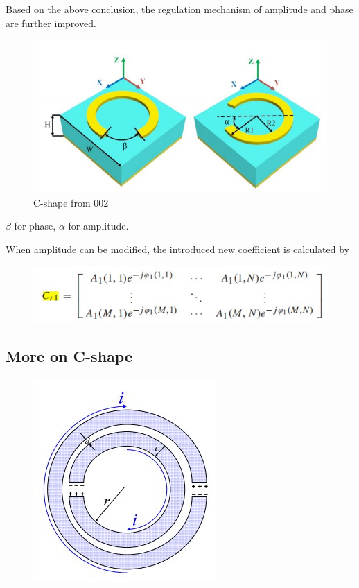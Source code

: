 \documentclass[]{article}
\begin{document}
	\par Based on the above conclusion, the regulation mechanism of amplitude and phase are further improved.
	
	\begin{figure}[H]
		\centering
		\includegraphics[scale=0.65]{Fig/13.jpg}
		\caption{C-shape from 002}
	\end{figure}
	\par $\beta$ for phase, $\alpha$ for amplitude.
	\par When amplitude can be modified, the introduced new coefficient is calculated by
	
	\begin{figure}[H]
		\centering
		\includegraphics[scale=0.8]{Fig/14.jpg}
	\end{figure}


	\subsection*{More on C-shape}
	\begin{figure}[H]
		\centering
		\includegraphics[scale=0.8]{Fig/15.jpg}
	\end{figure}
\end{document}
